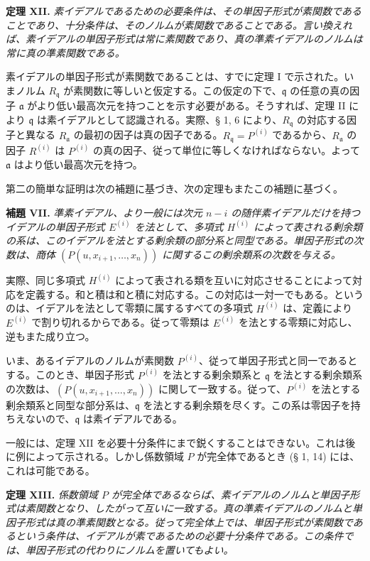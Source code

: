 \documentclass[11pt]{article}
\providecommand{\frakq}{\mathfrak q}
\providecommand{\fraka}{\mathfrak a}
\providecommand{\frakq}{\mathfrak q}
\begin{document}
\textbf{定理 XII.} \emph{素イデアルであるための必要条件は、その単因子形式が素関数であることであり、十分条件は、そのノルムが素関数であることである。言い換えれば、素イデアルの単因子形式は常に素関数であり、真の準素イデアルのノルムは常に真の準素関数である。}

素イデアルの単因子形式が素関数であることは、すでに定理 I で示された。いまノルム $R_{\frakq}$ が素関数に等しいと仮定する。この仮定の下で、$\frakq$ の任意の真の因子 $\fraka$ がより低い最高次元を持つことを示す必要がある。そうすれば、定理 II により $\frakq$ は素イデアルとして認識される。実際、§ 1, 6 により、$R_\frakq$ の対応する因子と異なる $R_\fraka$ の最初の因子は真の因子である。$R_\frakq=P^{(i)}$ であるから、$R_\fraka$ の因子 $R^{(i)}$ は $P^{(i)}$ の真の因子、従って単位に等しくなければならない。よって $\fraka$ はより低い最高次元を持つ。

第二の簡単な証明は次の補題に基づき、次の定理もまたこの補題に基づく。

\textbf{補題 VII.} \emph{準素イデアル、より一般には次元 $n-i$ の随伴素イデアルだけを持つイデアルの単因子形式 $E^{(i)}$ を法として、多項式 $H^{(i)}$ によって表される剰余類の系は、このイデアルを法とする剰余類の部分系と同型である。単因子形式の次数は、商体 $(P(u,x_{i+1},\ldots,x_n))$ に関するこの剰余類系の次数を与える。}

実際、同じ多項式 $H^{(i)}$ によって表される類を互いに対応させることによって対応を定義する。和と積は和と積に対応する。この対応は一対一でもある。というのは、イデアルを法として零類に属するすべての多項式 $H^{(i)}$ は、定義により $E^{(i)}$ で割り切れるからである。従って零類は $E^{(i)}$ を法とする零類に対応し、逆もまた成り立つ。

いま、あるイデアルのノルムが素関数 $P^{(i)}$、従って単因子形式と同一であるとする。このとき、単因子形式 $P^{(i)}$ を法とする剰余類系と $\frakq$ を法とする剰余類系の次数は、$(P(u,x_{i+1},\ldots,x_n))$ に関して一致する。従って、$P^{(i)}$ を法とする剰余類系と同型な部分系は、$\frakq$ を法とする剰余類を尽くす。この系は零因子を持ちえないので、$\frakq$ は素イデアルである。

一般には、定理 XII を必要十分条件にまで鋭くすることはできない。これは後に例によって示される。しかし係数領域 $P$ が完全体であるとき (§ 1, 14) には、これは可能である。

\textbf{定理 XIII.} \emph{係数領域 $P$ が完全体であるならば、素イデアルのノルムと単因子形式は素関数となり、したがって互いに一致する。真の準素イデアルのノルムと単因子形式は真の準素関数となる。従って完全体上では、単因子形式が素関数であるという条件は、イデアルが素であるための必要十分条件である。この条件では、単因子形式の代わりにノルムを置いてもよい。}
\end{document}
